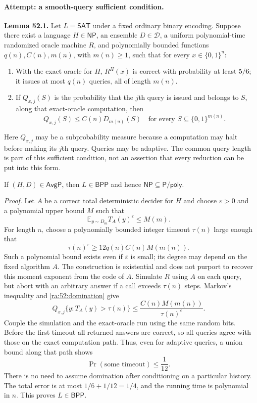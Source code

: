 \documentclass[11pt]{article}
\newcommand{\E}{\mathbb{E}}
\begin{document}
\paragraph{Attempt: a smooth-query sufficient condition.}
\textbf{Lemma 52.1.} Let $L=\mathsf{SAT}$ under a fixed ordinary binary
encoding. Suppose there exist a language $H\in\mathsf{NP}$, an ensemble
$D\in\mathcal D$, a uniform polynomial-time randomized oracle machine $R$,
and polynomially bounded functions $q(n),C(n),m(n)$, with $m(n)\ge1$, such
that for every $x\in\{0,1\}^n$:

\begin{enumerate}[label=(\roman*),leftmargin=2.5em]
\item With the exact oracle for $H$, $R^H(x)$ is correct with probability
at least $5/6$; it issues at most $q(n)$ queries, all of length $m(n)$.
\item If $Q_{x,j}(S)$ is the probability that the $j$th query is issued
and belongs to $S$, along that exact-oracle computation, then
\begin{equation}\label{ra:52:domination}
 Q_{x,j}(S)\le C(n)D_{m(n)}(S)
 \quad\text{for every }S\subseteq\{0,1\}^{m(n)}.
\end{equation}
\end{enumerate}
Here $Q_{x,j}$ may be a subprobability measure because a computation may
halt before making its $j$th query. Queries may be adaptive. The common
query length is part of this sufficient condition, not an assertion that
every reduction can be put into this form.

If $(H,D)\in\mathsf{AvgP}$, then $L\in\mathsf{BPP}$ and hence
$\mathsf{NP}\subseteq\mathsf{P/poly}$.

\textit{Proof.} Let $A$ be a correct total deterministic decider for $H$
and choose $\varepsilon>0$ and a polynomial upper bound $M$ such that
\[
 \E_{y\sim D_m}T_A(y)^\varepsilon\le M(m).
\]
For length $n$, choose a polynomially bounded integer timeout $\tau(n)$
large enough that
\begin{equation}\label{ra:52:timeout}
 \tau(n)^\varepsilon\ge
 12q(n)C(n)M(m(n)).
\end{equation}
Such a polynomial bound exists even if $\varepsilon$ is small; its degree
may depend on the fixed algorithm $A$. The construction is existential
and does not purport to recover this moment exponent from the code of $A$.
Simulate $R$ using $A$ on each query, but abort with an arbitrary answer
if a call exceeds $\tau(n)$ steps. Markov's inequality and
\eqref{ra:52:domination} give
\[
 Q_{x,j}\{y:T_A(y)>\tau(n)\}
 \le\frac{C(n)M(m(n))}{\tau(n)^\varepsilon}.
\]
Couple the simulation and the exact-oracle run using the same random
bits. Before the first timeout all returned answers are correct, so all
queries agree with those on the exact computation path. Thus, even for
adaptive queries, a union bound along that path shows
\[
 \Pr(\text{some timeout})\le\frac1{12}.
\]
There is no need to assume domination after conditioning on a particular
history. The total error is at most $1/6+1/12=1/4$, and the running time
is polynomial in $n$. This proves $L\in\mathsf{BPP}$.
\end{document}
